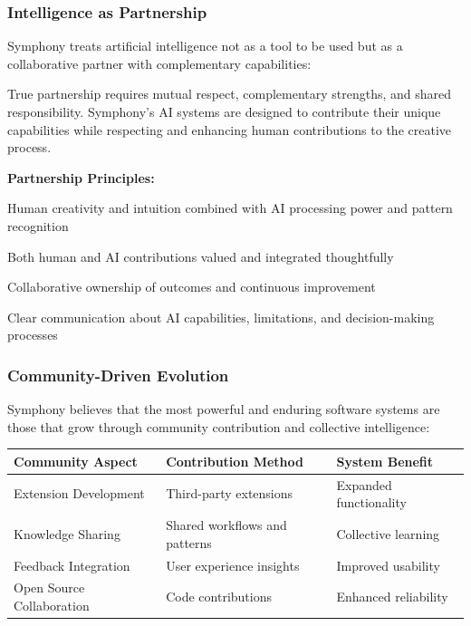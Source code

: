 \subsubsection{Intelligence as Partnership}

Symphony treats artificial intelligence not as a tool to be used but as a collaborative partner with complementary capabilities:

\begin{successbox}
True partnership requires mutual respect, complementary strengths, and shared responsibility. Symphony's AI systems are designed to contribute their unique capabilities while respecting and enhancing human contributions to the creative process.
\end{successbox}

\textbf{Partnership Principles:}

\begin{description}[leftmargin=4cm,labelwidth=3.5cm]
    \item[\textbf{Complementary Strengths}] Human creativity and intuition combined with AI processing power and pattern recognition
    
    \item[\textbf{Mutual Respect}] Both human and AI contributions valued and integrated thoughtfully
    
    \item[\textbf{Shared Responsibility}] Collaborative ownership of outcomes and continuous improvement
    
    \item[\textbf{Transparent Interaction}] Clear communication about AI capabilities, limitations, and decision-making processes
\end{description}

\subsubsection{Community-Driven Evolution}

Symphony believes that the most powerful and enduring software systems are those that grow through community contribution and collective intelligence:

\begin{center}
\begin{tabular}{@{}lll@{}}
\toprule
\textbf{Community Aspect} & \textbf{Contribution Method} & \textbf{System Benefit} \\
\midrule
Extension Development & Third-party extensions & Expanded functionality \\
Knowledge Sharing & Shared workflows and patterns & Collective learning \\
Feedback Integration & User experience insights & Improved usability \\
Open Source Collaboration & Code contributions & Enhanced reliability \\
\bottomrule
\end{tabular}
\label{tab:community-evolution}
\end{center}


